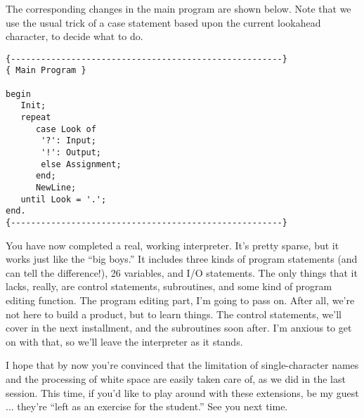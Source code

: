 The corresponding changes in  the  main  program are shown below. Note that we use the usual  trick  of a case statement based upon the current lookahead character, to decide what to do.

\begin{verbatim}
{------------------------------------------------------}
{ Main Program }

begin
   Init;
   repeat
      case Look of
       '?': Input;
       '!': Output;
       else Assignment;
      end;
      NewLine;
   until Look = '.';
end.
{------------------------------------------------------}
\end{verbatim}

You have now completed a  real, working interpreter. It's pretty sparse, but it works just like the ``big boys.''  It includes three kinds of program statements  (and  can  tell the difference!), 26 variables, and  I/O  statements. The only things that it lacks, really, are control statements, subroutines, and some kind of program editing function. The program editing part, I'm going to pass on. After all, we're  not  here  to build a product, but to learn  things. The control statements, we'll cover in the next installment, and the subroutines soon  after. I'm anxious to get on with that, so we'll leave the interpreter as it stands.

I hope that by  now  you're convinced that the limitation of single-character names  and the processing of white space are easily taken  care  of, as we did in the last session. This  time, if you'd like to play around with these extensions, be my  guest ... they're  ``left as an exercise for the student.''    See  you  next time.

